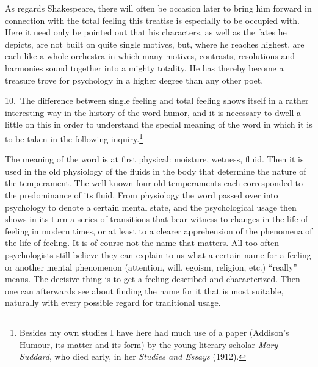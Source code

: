 \documentclass[12pt]{book}
\newcommand{\opage}[1]{\marginnote{\footnotesize\textit{[#1]}}}
\begin{document}
As regards Shakespeare, there will often be occasion later to bring him forward
in connection with the total feeling this treatise is especially to be occupied
with. Here it need only be pointed out that his characters, as well as the fates he
depicts, are not built on quite single motives, but, where he reaches highest, are
each like a whole orchestra in which many motives, contrasts, resolutions and
harmonies sound together
into a mighty totality. He has thereby become a treasure trove for psychology in
a higher degree than any other poet.

10.~The difference between single feeling and total feeling shows itself in a
rather interesting way in the history of the word humor, and it is necessary to
dwell a little on this in order to understand the special meaning of the word in
which it is to be taken in the following inquiry.\footnote{Besides my own studies
I have here had much use of a paper (Addison's Humour, its matter and its form) by
the young literary scholar \textit{Mary Suddard}, who died early, in her
\textit{Studies and Essays} (1912).}

The meaning of the word is at first physical: moisture, wetness, fluid. Then it
is used in the old physiology of the fluids in the body that determine the nature
of the temperament. The well-known four old temperaments each corresponded to the
predominance of its fluid. From physiology the word passed over into psychology
to denote a certain mental state, and the psychological usage then shows
\opage{41}in its turn a series of transitions that bear witness to changes in the
life of feeling in modern times, or at least to a clearer apprehension of the
phenomena of the life of feeling. It is of course not the name that matters. All
too often psychologists still believe they can explain to us what a certain name
for a feeling or another mental phenomenon (attention, will, egoism, religion,
etc.) ``really'' means. The decisive thing is to get a feeling described and
characterized. Then one can afterwards see about finding the name for it that is
most suitable, naturally with every possible regard for traditional usage.
\end{document}

